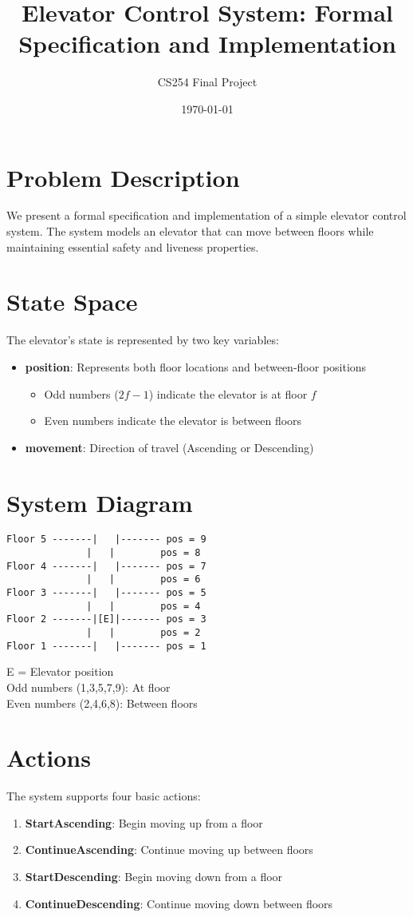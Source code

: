 \documentclass{article}
\title{Elevator Control System: Formal Specification and Implementation}
\author{CS254 Final Project}
\date{\today}
\begin{document}
\maketitle

\section{Problem Description}
We present a formal specification and implementation of a simple elevator control system. The system models an elevator that can move between floors while maintaining essential safety and liveness properties.

\section{State Space}
The elevator's state is represented by two key variables:
\begin{itemize}
    \item \textbf{position}: Represents both floor locations and between-floor positions
    \begin{itemize}
        \item Odd numbers ($2f-1$) indicate the elevator is at floor $f$
        \item Even numbers indicate the elevator is between floors
    \end{itemize}
    \item \textbf{movement}: Direction of travel (Ascending or Descending)
\end{itemize}

\section{System Diagram}
\begin{verbatim}
Floor 5 -------|   |------- pos = 9
              |   |        pos = 8
Floor 4 -------|   |------- pos = 7
              |   |        pos = 6
Floor 3 -------|   |------- pos = 5
              |   |        pos = 4
Floor 2 -------|[E]|------- pos = 3
              |   |        pos = 2
Floor 1 -------|   |------- pos = 1
\end{verbatim}
\begin{center}
E = Elevator position\\[1em]
Odd numbers (1,3,5,7,9): At floor\\[0.5em]
Even numbers (2,4,6,8): Between floors
\end{center}

\section{Actions}
The system supports four basic actions:
\begin{enumerate}
    \item \textbf{StartAscending}: Begin moving up from a floor
    \item \textbf{ContinueAscending}: Continue moving up between floors
    \item \textbf{StartDescending}: Begin moving down from a floor
    \item \textbf{ContinueDescending}: Continue moving down between floors
\end{enumerate}
\end{document}
